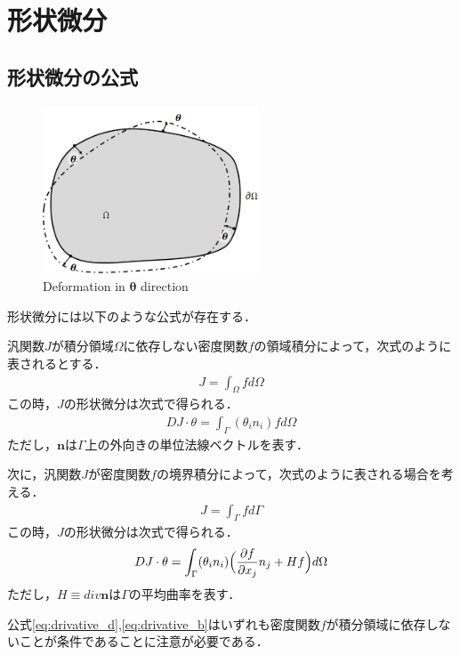 \chapter{形状微分}
\section{形状微分の公式}

\begin{figure}[ht]
	\begin{center}
		\includegraphics[height=5cm]{./figures/SDFormula.png}
		\caption{Deformation in $\bm{\theta}$ direction}
		\label{fig:SDFormula}
	\end{center}
\end{figure}

形状微分には以下のような公式が存在する．

汎関数$J$が積分領域$\Omega$に依存しない密度関数$f$の領域積分によって，次式のように表されるとする．
\begin{align}
	J=\int_{\Omega}f d\Omega
	\label{eq:functinal_d}
\end{align}
この時，$J$の形状微分は次式で得られる．
\begin{align}
	DJ\cdot\theta=\int_{\Gamma}(\theta_{i}n_{i})f d\Omega
	\label{eq:drivative_d}
\end{align}
ただし，$\bm{n}$は$\Gamma$上の外向きの単位法線ベクトルを表す．

次に，汎関数$J$が密度関数$f$の境界積分によって，次式のように表される場合を考える．
\begin{align}
	J=\int_{\Gamma}f d\Gamma
	\label{eq:functinal_b}
\end{align}
この時，$J$の形状微分は次式で得られる．
\begin{align}
	DJ\cdot\theta=\int_{\Gamma}(\theta_{i}n_{i})\Bigr(\frac{\partial f}{\partial x_{j}}n_{j}+Hf\Bigl) d\Omega
	\label{eq:drivative_b}
\end{align}
ただし，$H\equiv div\bm{n}$は$\Gamma$の平均曲率を表す．

公式\eqref{eq:drivative_d},\eqref{eq:drivative_b}はいずれも密度関数$f$が積分領域に依存しないことが条件であることに注意が必要である．

